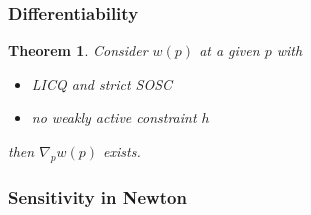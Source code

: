 \documentclass{article}
\newtheorem{theorem}{Theorem}[section]
\theoremstyle{example}
\theoremstyle{definition}
\theoremstyle{assumption}
\theoremstyle{lemma}
\begin{document}
	\subsubsection{Differentiability}
\begin{theorem}
	Consider $w(p)$ at a given $p$ with
	\begin{itemize}
		\item LICQ and strict SOSC
		\item no weakly active constraint $h$
	\end{itemize}
	then $\nabla_pw(p)$ exists.
\end{theorem}
	\subsubsection{Sensitivity in Newton}
\end{document}

